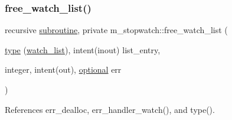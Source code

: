 \mbox{\label{namespacem__stopwatch_a5b5053a6d9b4a5c8395c25510fb99790}} 
\subsubsection{\texorpdfstring{free\+\_\+watch\+\_\+list()}{free\_watch\_list()}}
{\footnotesize\ttfamily recursive \hyperlink{M__stopwatch_83_8txt_acfbcff50169d691ff02d4a123ed70482}{subroutine}, private m\+\_\+stopwatch\+::free\+\_\+watch\+\_\+list (\begin{DoxyParamCaption}\item[{\hyperlink{stop__watch_83_8txt_a70f0ead91c32e25323c03265aa302c1c}{type} (\hyperlink{structm__stopwatch_1_1watch__list}{watch\+\_\+list}), intent(inout)}]{list\+\_\+entry,  }\item[{integer, intent(out), \hyperlink{option__stopwatch_83_8txt_aa4ece75e7acf58a4843f70fe18c3ade5}{optional}}]{err }\end{DoxyParamCaption})\hspace{0.3cm}{\ttfamily [private]}}



References err\+\_\+dealloc, err\+\_\+handler\+\_\+watch(), and type().

